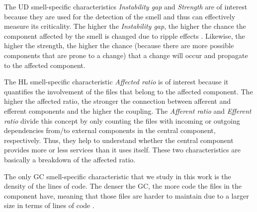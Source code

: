 The UD smell-specific characteristics \emph{Instability gap} and \emph{Strength} are of interest because they are used for the detection of the smell and thus can effectively measure its criticality. The higher the \emph{Instability gap}, the higher the chance the component affected by the smell is changed due to ripple effects \cite{Martin2018}. Likewise, the higher the strength, the higher the chance (because there are more possible components that are prone to a change) that a change will occur and propagate to the affected component.

The HL smell-specific characteristic \emph{Affected ratio} is of interest because it quantifies the involvement of the files that belong to the affected component.
The higher the affected ratio, the stronger the connection between afferent and efferent components and the higher the coupling.
The \emph{Afferent ratio} and \emph{Efferent ratio} divide this concept by only counting the files with incoming or outgoing dependencies from/to external components in the central component, respectively.
Thus, they help to understand whether the central component provides more or less services than it uses itself. These two characteristics are basically a breakdown of the affected ratio.

The only GC smell-specific characteristic that we study in this work is the density of the lines of code.
The denser the GC, the more code the files in the component have, meaning that those files are harder to maintain due to a larger size in terms of lines of code \cite{Nunez-Varela2017}.


